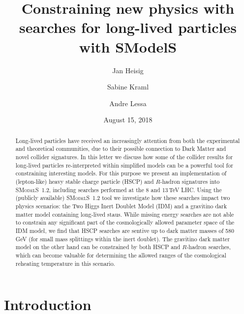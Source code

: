 \documentclass[preprint,number,sort&compress,twocolumn,3p]{elsstyarticle}
\newcommand{\smo}{\textsc{SModelS}}
\begin{document}
\title{{%
Constraining new physics with
searches for long-lived particles with SModelS}}

\date{August 15, 2018}
\author[a]{Jan Heisig}
\address[a]{Institute for Theoretical Particle Physics and Cosmology, RWTH Aachen University, 52056 Aachen, Germany}
\author[b]{Sabine Kraml}
\address[b]{Laboratoire de Physique Subatomique et de Cosmologie, Universit\'e
    Grenoble-Alpes, CNRS/IN2P3, 53 Avenue des Martyrs, F-38026 Grenoble, France}
\author[c]{Andre Lessa}
\address[c]{Centro de Ci\^encias Naturais e Humanas, Universidade Federal do ABC, Santo Andr\'e, 09210-580 SP, Brazil}


\begin{abstract}
Long-lived particles have received an increasingly attention from
both the experimental and theoretical communities, due to their possible connection
to Dark Matter and novel collider signatures.
In this letter we discuss how some of the collider results for long-lived particles
re-interpreted within simplified models can be a powerful tool for constraining interesting models. For this purpose we present an implementation of (lepton-like) heavy stable charge
particle (HSCP) and $R$-hadron signatures into \smo~1.2, including searches 
performed at the 8 and 13\,TeV LHC. Using the (publicly available) \smo~1.2
tool we investigate how these searches impact two physics scenarios:
the Two Higgs Inert Doublet Model (IDM) and a gravitino dark matter model containing long-lived staus. 
While missing energy searches are not able to constrain any significant
part of the cosmologically allowed parameter space of the IDM model,
we find that HSCP searches are sentive up to dark
matter masses of 580\,GeV (for small mass splittings within the inert
doublet). The gravitino dark matter model on the other hand can be constrained by both HSCP and $R$-hadron searches, which can become
valuable for determining the allowed ranges of the cosmological reheating temperature in this scenario.
\end{abstract}

\maketitle






\section{Introduction}\label{sec:intro}
\end{document}
